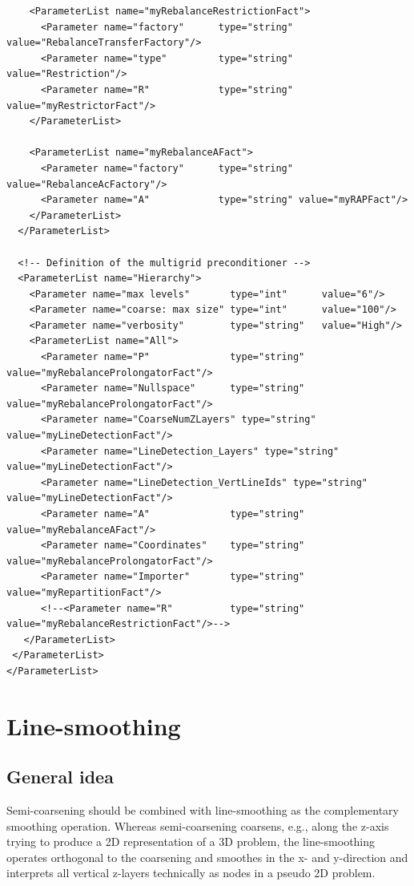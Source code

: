 \documentclass[10pt,fleqn]{book}
\begin{document}
\begin{lstlisting}
    <ParameterList name="myRebalanceRestrictionFact">
      <Parameter name="factory"      type="string" value="RebalanceTransferFactory"/>
      <Parameter name="type"         type="string" value="Restriction"/>
      <Parameter name="R"            type="string" value="myRestrictorFact"/>
    </ParameterList>

    <ParameterList name="myRebalanceAFact">
      <Parameter name="factory"      type="string" value="RebalanceAcFactory"/>
      <Parameter name="A"            type="string" value="myRAPFact"/>
    </ParameterList>
  </ParameterList>

  <!-- Definition of the multigrid preconditioner -->
  <ParameterList name="Hierarchy">
    <Parameter name="max levels"       type="int"      value="6"/>
    <Parameter name="coarse: max size" type="int"      value="100"/>
    <Parameter name="verbosity"        type="string"   value="High"/>
    <ParameterList name="All">
      <Parameter name="P"              type="string"   value="myRebalanceProlongatorFact"/>
      <Parameter name="Nullspace"      type="string"   value="myRebalanceProlongatorFact"/>
      <Parameter name="CoarseNumZLayers" type="string"   value="myLineDetectionFact"/>
      <Parameter name="LineDetection_Layers" type="string"   value="myLineDetectionFact"/>
      <Parameter name="LineDetection_VertLineIds" type="string"   value="myLineDetectionFact"/>
      <Parameter name="A"              type="string"   value="myRebalanceAFact"/>
      <Parameter name="Coordinates"    type="string"   value="myRebalanceProlongatorFact"/>
      <Parameter name="Importer"       type="string"   value="myRepartitionFact"/>
      <!--<Parameter name="R"          type="string"   value="myRebalanceRestrictionFact"/>-->
   </ParameterList>
 </ParameterList>
</ParameterList>
\end{lstlisting}

\section{Line-smoothing}
\label{sec:linesmoothing}
\subsection{General idea}
Semi-coarsening should be combined with line-smoothing as the complementary smoothing operation. Whereas semi-coarsening coarsens, e.g., along the z-axis trying to produce a 2D representation of a 3D problem, the line-smoothing operates orthogonal to the coarsening and smoothes in the x- and y-direction and interprets all vertical z-layers technically as nodes in a pseudo 2D problem.
\end{document}
